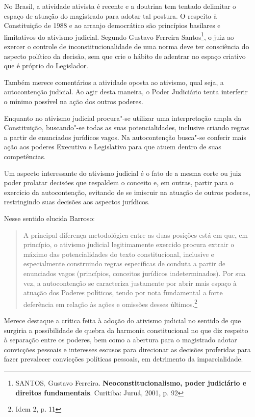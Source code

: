 {No Brasil, a atividade ativista é recente e a doutrina tem tentado
delimitar o espaço de atuação do magistrado para adotar tal postura. O
respeito à Constituição de 1988 e ao arranjo democrático são princípios
basilares e limitativos do ativismo judicial. Segundo Gustavo Ferreira
Santos\footnote{SANTOS, Gustavo Ferreira. \textbf{Neoconstitucionalismo,
  poder judiciário e} \textbf{direitos fundamentais}. Curitiba: Juruá,
  2001, p. 92}, o juiz ao exercer o controle de inconstitucionalidade de
uma norma deve ter consciência do aspecto político da decisão, sem que
crie o hábito de adentrar no espaço criativo que é próprio do
Legislador.

Também merece comentários a atividade oposta ao ativismo, qual seja, a
autocontenção judicial. Ao agir desta maneira, o Poder Judiciário tenta
interferir o mínimo possível na ação dos outros poderes.

Enquanto no ativismo judicial procura"-se utilizar uma interpretação
ampla da Constituição, buscando"-se todas as suas potencialidades,
inclusive criando regras a partir de enunciados jurídicos vagos. Na
autocontenção busca"-se conferir mais ação aos poderes Executivo e
Legislativo para que atuem dentro de suas competências.

Um aspecto interessante do ativismo judicial é o fato de a mesma corte
ou juiz poder prolatar decisões que respaldem o conceito e, em outras,
partir para o exercício da autocontenção, evitando de se imiscuir na
atuação de outros poderes, restringindo suas decisões aos aspectos
jurídicos.

Nesse sentido elucida Barroso:

\begin{quote}
A principal diferença metodológica entre as duas posições está em que,
em princípio, o ativismo judicial legitimamente exercido procura extrair
o máximo das potencialidades do texto constitucional, inclusive e
especialmente construindo regras específicas de conduta a partir de
enunciados vagos (princípios, conceitos jurídicos indeterminados). Por
sua vez, a autocontenção se caracteriza justamente por abrir mais espaço
à atuação dos Poderes políticos, tendo por nota fundamental a forte
deferência em relação às ações e omissões desses últimos.\footnote{Idem
  2, p. 11}
\end{quote}

Merece destaque a crítica feita à adoção do ativismo judicial no sentido
de que surgiria a possibilidade de quebra da harmonia constitucional no
que diz respeito à separação entre os poderes, bem como a abertura para
o magistrado adotar convicções pessoais e interesses escusos para
direcionar as decisões proferidas para fazer prevalecer convicções
políticas pessoais, em detrimento da imparcialidade.

}
